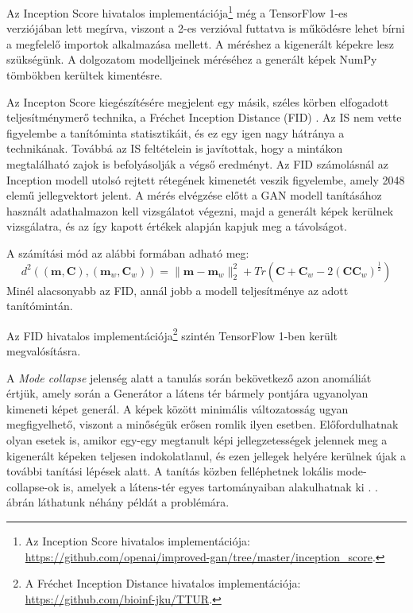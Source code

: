 Az Inception Score hivatalos implementációja\footnote{Az Inception Score hivatalos implementációja: \url{https://github.com/openai/improved-gan/tree/master/inception\_score}.} még a TensorFlow 1-es verziójában lett megírva, viszont a 2-es verzióval futtatva is működésre lehet bírni a megfelelő importok alkalmazása mellett. A méréshez a kigenerált képekre lesz szükségünk. A dolgozatom modelljeinek méréséhez a generált képek NumPy tömbökben kerültek kimentésre. %

Az Incepton Score kiegészítésére megjelent egy másik, széles körben elfogadott teljesítménymerő technika, a Fréchet Inception Distance (FID) \cite{heusel2017gans}. Az IS nem vette figyelembe a tanítóminta statisztikáit, és ez egy igen nagy hátránya a technikának. Továbbá az IS feltételein is javítottak, hogy a mintákon megtalálható zajok is befolyásolják a végső eredményt. Az FID számolásnál az Inception modell utolsó rejtett rétegének kimenetét veszik figyelembe, amely 2048 elemű jellegvektort jelent. A mérés elvégzése előtt a GAN modell tanításához használt adathalmazon kell vizsgálatot végezni, majd a generált képek kerülnek vizsgálatra, és az így kapott értékek alapján kapjuk meg a távolságot.

A számítási mód az alábbi formában adható meg:
$$ d^2((\boldsymbol{m}, \boldsymbol{C}), (\boldsymbol{m}_w, \boldsymbol{C}_w)) = \|\boldsymbol{m} - \boldsymbol{m}_w \|_2^2 + Tr(\boldsymbol{C} + \boldsymbol{C}_w - 2(\boldsymbol{C}\boldsymbol{C}_w)^{\frac{1}{2}}) $$
Minél alacsonyabb az FID, annál jobb a modell teljesítménye az adott tanítómintán.

Az FID hivatalos implementációja\footnote{A Fréchet Inception Distance hivatalos implementációja: \url{https://github.com/bioinf-jku/TTUR}.} szintén TensorFlow 1-ben került megvalósításra.


A \textit{Mode collapse} jelenség alatt a tanulás során bekövetkező azon anomáliát értjük, amely során a Generátor a látens tér bármely pontjára ugyanolyan kimeneti képet generál. A képek között minimális változatosság ugyan megfigyelhető, viszont a minőségük erősen romlik ilyen esetben. Előfordulhatnak olyan esetek is, amikor egy-egy megtanult képi jellegzetességek jelennek meg a kigenerált képeken teljesen indokolatlanul, és ezen jellegek helyére kerülnek újak a további tanítási lépések alatt. A tanítás közben felléphetnek lokális mode-collapse-ok is, amelyek a látens-tér egyes tartományaiban alakulhatnak ki \cite{zhang2018stackgan++}. . ábrán láthatunk néhány példát a problémára.


